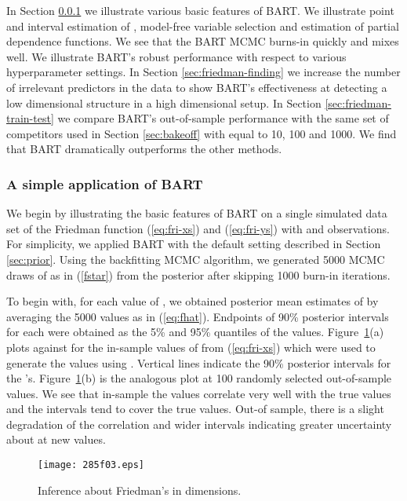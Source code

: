 \documentclass[aoas,nameyear,dvips]{arximspdf}
\begin{document}
In Section \ref{sec:friedman-simple} we illustrate various basic
features of BART.  We illustrate point and interval estimation of
,  model-free variable selection and estimation of partial
dependence functions.  We see that the BART MCMC burns-in quickly and
mixes well. We illustrate BART's robust performance with respect to
various hyperparameter settings.  In Section \ref{sec:friedman-finding}
we increase the number of irrelevant predictors in the data to show
BART's effectiveness at detecting a low dimensional structure in a high
dimensional setup. In Section \ref{sec:friedman-train-test} we compare
BART's out-of-sample performance with the same set of competitors used
in Section \ref{sec:bakeoff} with  equal to 10, 100 and 1000. We
find that BART dramatically outperforms the other methods.


\subsubsection{A simple application of BART}\label{sec:friedman-simple}

We begin by illustrating the basic features of BART on a single simulated data set
of the Friedman function (\ref{eq:fri-xs}) and (\ref{eq:fri-ys})
with   and  observations. For simplicity, we
applied BART with the default setting 
described in Section \ref{sec:prior}.
Using the backfitting MCMC algorithm, we generated 5000 MCMC draws
of  as in (\ref{fstar}) from the posterior  after skipping
1000 burn-in iterations.

To begin with, for each value of , we obtained
posterior mean estimates  of   by averaging the
5000  values as in (\ref{eq:fhat}). Endpoints of 90\% posterior intervals for
each  were obtained as the 5\% and 95\% quantiles of the
 values.  Figure~\ref{fig:friedman}(a)
plots  against
 for the  in-sample values of  from
(\ref{eq:fri-xs}) which were used to generate the  values using
. Vertical lines indicate the 90\% posterior
intervals for the 's. Figure~\ref{fig:friedman}(b) is the
analogous plot at 100 randomly selected out-of-sample  values.
We see that in-sample the  values correlate very well with the
true  values and the intervals tend to cover the true
values.  Out-of sample, there is a slight degradation of the correlation and
wider intervals indicating
greater uncertainty about  at new  values.

\begin{figure}[b]

\texttt{[image: 285f03.eps]}

 \caption{Inference about Friedman's  in  dimensions.}\label{fig:friedman}
\end{figure}
\end{document}
